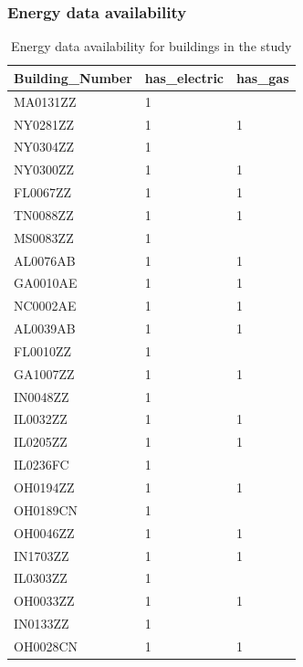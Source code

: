 \documentclass[12pt]{article}
\begin{document}
\subsubsection{Energy data availability}
\begin{longtable}{lll}
\caption{Energy data availability for buildings in the study}\\
\label{tab:energy_avail}
Building\_Number & has\_electric & has\_gas \\ \hline \hline \endhead
MA0131ZZ         & 1             &          \\
NY0281ZZ         & 1             & 1        \\
NY0304ZZ         & 1             &          \\
NY0300ZZ         & 1             & 1        \\
FL0067ZZ         & 1             & 1        \\
TN0088ZZ         & 1             & 1        \\
MS0083ZZ         & 1             &          \\
AL0076AB         & 1             & 1        \\
GA0010AE         & 1             & 1        \\
NC0002AE         & 1             & 1        \\
AL0039AB         & 1             & 1        \\
FL0010ZZ         & 1             &          \\
GA1007ZZ         & 1             & 1        \\
IN0048ZZ         & 1             &          \\
IL0032ZZ         & 1             & 1        \\
IL0205ZZ         & 1             & 1        \\
IL0236FC         & 1             &          \\
OH0194ZZ         & 1             & 1        \\
OH0189CN         & 1             &          \\
OH0046ZZ         & 1             & 1        \\
IN1703ZZ         & 1             & 1        \\
IL0303ZZ         & 1             &          \\
OH0033ZZ         & 1             & 1        \\
IN0133ZZ         & 1             &          \\
OH0028CN         & 1             & 1        \\

\end{longtable}
\end{document}

